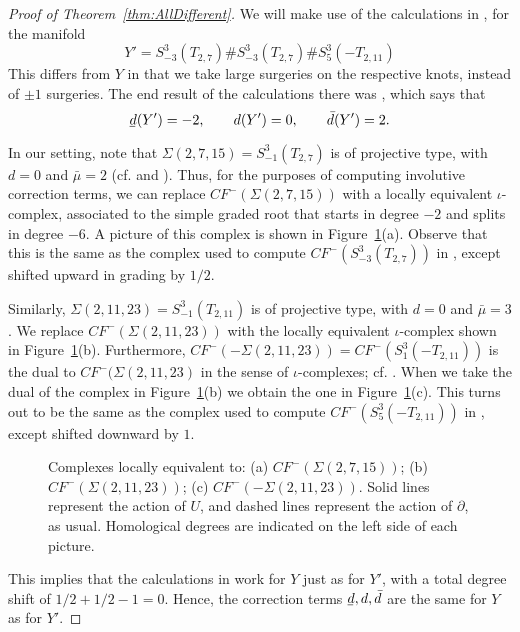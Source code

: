 \documentclass[11 pt]{amsart}
\theoremstyle{remark}
\def\del {{\partial}}
\newcommand{\bunderline}[1]{\underline{#1\mkern-2mu}\mkern2mu }
\def\du {\bar{d}}
\def\dl {\bunderline{d}}
\def\CF {\mathit{CF}}
\newcommand \CFm {\CF^-}
\def\inv{\iota}
\begin{document}
\begin{proof}[Proof of Theorem~\ref{thm:AllDifferent}]
We will make use of the calculations in  \cite[Section 9.2]{HMZ}, for the manifold 
$$Y' =S^3_{-3}(T_{2,7}) \# S^3_{-3}(T_{2,7}) \# S^3_{5}(-T_{2,11})$$
This differs from $Y$ in that we take large surgeries on the respective knots, instead of $\pm 1$ surgeries. The end result of the calculations there was \cite[Proposition 1.5]{HMZ}, which says that
$$ \dl(Y') = -2, \quad \quad d(Y') = 0, \quad \quad \du(Y') = 2.$$

In our setting, note that $\Sigma(2,7,15) = S^3_{-1}(T_{2,7})$ is of projective type, with $d=0$ and $\bar \mu =2$ (cf. \cite[Section 5]{NemethiGRS} and \cite[Section 5.2]{Stoffregen}). Thus, for the purposes of computing involutive correction terms, we can replace $\CFm(\Sigma(2,7,15))$ with a locally equivalent $\inv$-complex, associated to the simple graded root that starts in degree $-2$ and splits in degree $-6$. A picture of this complex is shown in Figure~\ref{fig:AllDifferent}(a). Observe that this is the same as the complex used to compute $\CFm(S^3_{-3}(T_{2,7}))$ in \cite[Figure 14]{HMZ}, except shifted upward in grading by $1/2$.

Similarly, $\Sigma(2,11,23)= S^3_{-1}(T_{2,11})$ is of projective type, with $d=0$ and $\bar \mu = 3$. We replace $\CFm(\Sigma(2,11,23))$ with the locally equivalent $\inv$-complex shown in  Figure~\ref{fig:AllDifferent}(b). Furthermore, $\CFm(-\Sigma(2,11,23))=\CFm(S^3_1(-T_{2,11}))$ is the dual to $\CFm(\Sigma(2,11,23)$ in the sense of $\inv$-complexes; cf. \cite[Theorem 1.8 and Section 8.3]{HMZ}. When we take the dual of the complex in Figure~\ref{fig:AllDifferent}(b) we obtain the one in Figure~\ref{fig:AllDifferent}(c). This turns out to be the same as the complex used to compute $\CFm(S^3_5(-T_{2,11}))$ in \cite[Figure 20]{HMZ},  except shifted downward by $1$.

\begin {figure}
\begin {center}

\caption {Complexes locally equivalent to: (a) $\CFm(\Sigma(2,7,15))$; (b) $\CFm(\Sigma(2,11,23))$; (c) $\CFm(-\Sigma(2,11,23))$. Solid lines represent the action of $U$, and dashed lines represent the action of $\del$, as usual. Homological degrees are indicated on the left side of each picture. }
\label{fig:AllDifferent}
\end {center}
\end {figure}

This implies that the calculations in  \cite[Section 9.2]{HMZ} work for $Y$ just as for $Y'$, with a total degree shift of $1/2 + 1/2 -1=0$. Hence, the correction terms $\dl, d, \du$ are the same for $Y$ as for $Y'$.
\end{proof}
\end{document}
